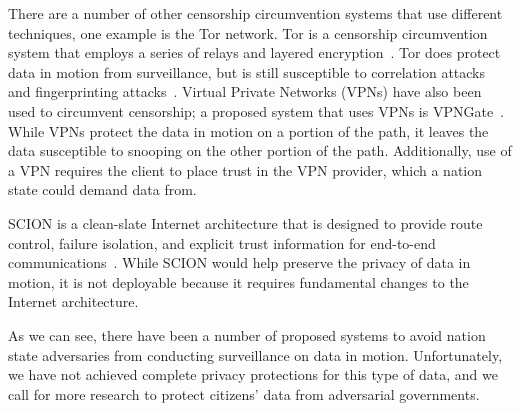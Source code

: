 There are a number of other censorship circumvention systems that use different techniques, one example is the Tor network.  Tor is a censorship circumvention system that employs a series of relays and layered encryption~\cite{dingledine2004tor}.  Tor does protect data in motion from surveillance, but is still susceptible to correlation attacks and fingerprinting attacks~\cite{sun2015raptor,shmatikov2006timing,feamster2004location,greschbach2016effect}.  Virtual Private Networks (VPNs) have also been used to circumvent censorship; a proposed system that uses VPNs is VPNGate~\cite{nobori2014vpn}.  While VPNs protect the data in motion on a portion of the path, it leaves the data susceptible to snooping on the other portion of the path.  Additionally, use of a VPN requires the client to place trust in the VPN provider, which a nation state could demand data from.   

SCION is a clean-slate Internet architecture that is designed to provide route control, failure isolation, and explicit trust information for end-to-end communications~\cite{zhang2011scion}.  While SCION would help preserve the privacy of data in motion, it is not deployable because it requires fundamental changes to the Internet architecture.

As we can see, there have been a number of proposed systems to avoid nation state adversaries from conducting surveillance on data in motion.  Unfortunately, we have not achieved complete privacy protections for this type of data, and we call for more research to protect citizens' data from adversarial governments.  
